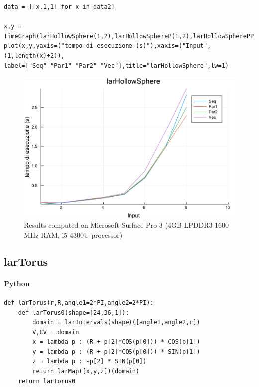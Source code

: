 \documentclass{article}
\begin{document}
\begin{Verbatim}
data = [[x,1,1] for x in data2]

x,y = TimeGraph(larHollowSphere(1,2),larHollowSphereP(1,2),larHollowSpherePP(1,2),larHollowSphereV(1,2),data,5)
plot(x,y,yaxis=("tempo di esecuzione (s)"),xaxis=("Input",(1,length(x)+2)),
label=["Seq" "Par1" "Par2" "Vec"],title="larHollowSphere",lw=1)

\end{Verbatim}

\begin{figure}[htbp] 
\centering 
\includegraphics[scale=.13]{larHollowSphereTime.png} 
\caption{Results computed on Microsoft Surface Pro  3 (4GB LPDDR3 1600 MHz RAM, i5-4300U processor)} 
\end{figure}

\subsection{larTorus}

\paragraph{Python}

\begin{verbatim}
def larTorus(r,R,angle1=2*PI,angle2=2*PI):
    def larTorus0(shape=[24,36,1]):
        domain = larIntervals(shape)([angle1,angle2,r])
        V,CV = domain
        x = lambda p : (R + p[2]*COS(p[0])) * COS(p[1])
        y = lambda p : (R + p[2]*COS(p[0])) * SIN(p[1])
        z = lambda p : -p[2] * SIN(p[0])
        return larMap([x,y,z])(domain)
    return larTorus0
\end{verbatim}
\end{document}

